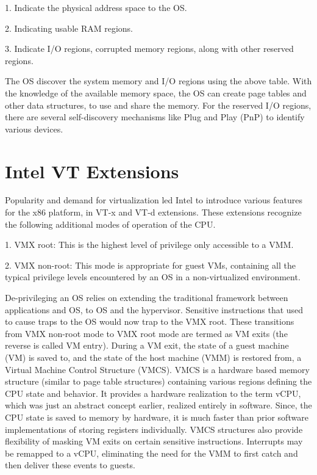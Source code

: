 1. Indicate the physical address space to the OS.

2. Indicating usable RAM regions.

3. Indicate I/O regions, corrupted memory regions, along with other reserved regions.

The OS discover the system memory and I/O regions using the above table. With the knowledge of the available memory space, the OS can create page tables and other data structures, to use and share the memory. For the reserved I/O regions, there are several self-discovery mechanisms like Plug and Play (PnP) to identify various devices. 


\section{Intel VT Extensions}


Popularity and demand for virtualization led Intel to introduce various features for the x86 platform, in VT-x \cite{intel_manual} and VT-d \cite{intelvtd} extensions. These extensions recognize the following additional modes of operation of the CPU.

1. VMX root: This is the highest level of privilege only accessible to a VMM.

2. VMX non-root: This mode is appropriate for guest VMs, containing all the typical privilege levels encountered by an OS in a non-virtualized environment.

De-privileging an OS relies on extending the traditional framework between applications and OS, to OS and the hypervisor. Sensitive instructions that used to cause traps to the OS would now trap to the VMX root. These transitions from VMX non-root mode to VMX root mode are termed as VM exits (the reverse is called VM entry). During a VM exit, the state of a guest machine (VM) is saved to, and the state of the host machine (VMM) is restored from, a Virtual Machine Control Structure (VMCS). VMCS is a hardware based memory structure (similar to page table structures) containing various regions defining the CPU state and behavior. It provides a hardware realization to the term vCPU, which was just an abstract concept earlier, realized entirely in software. Since, the CPU state is saved to memory by hardware, it is much faster than prior software implementations of storing registers individually. VMCS structures also provide flexibility of masking VM exits on certain sensitive instructions. Interrupts may be remapped to a vCPU, eliminating the need for the VMM to first catch and then deliver these events to guests.


